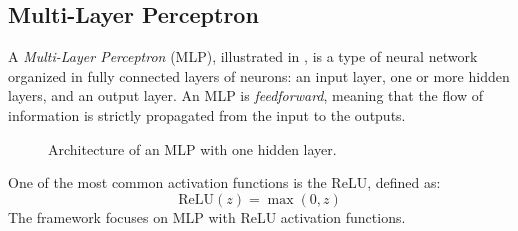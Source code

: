 \subsection{Multi-Layer Perceptron}
A \textit{Multi-Layer Perceptron} (MLP), illustrated in \textbf{}, is a type of neural network organized
in fully connected layers of neurons: an input layer, one or more hidden layers, and an output layer.
An MLP is \textit{feedforward}, meaning that the flow of information is strictly propagated from the input to
the outputs.
\begin{figure}[H]
    \centering
    \caption{Architecture of an MLP with one hidden layer.}
    \label{fig:mlp}
\end{figure}

One of the most common activation functions is the ReLU, defined as:
\begin{equation}
    \text{ReLU}(z) = \max(0, z)
\end{equation}
The framework focuses on MLP with ReLU activation functions.

